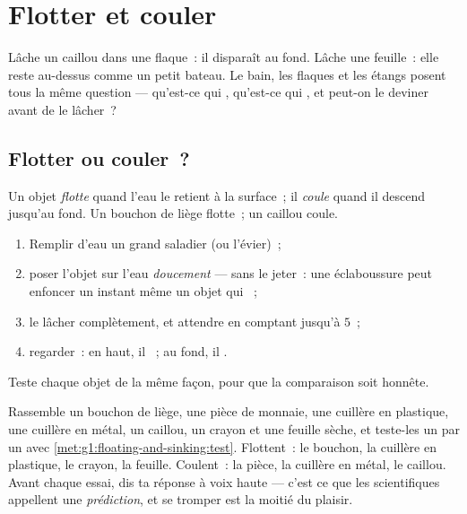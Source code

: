 \chapter{Flotter et couler}\label{ch:g1:floating-and-sinking}

Lâche un caillou dans une flaque~: il disparaît au fond. Lâche une
feuille~: elle reste au-dessus comme un petit bateau. Le bain, les
flaques et les étangs posent tous la même question --- qu'est-ce qui
, qu'est-ce qui , et peut-on le deviner avant de le
lâcher~?

\section{Flotter ou couler~?}

\begin{definition}\label{def:g1:floating-and-sinking:words}
Un objet \emph{flotte} quand l'eau le retient à la
surface~; il \emph{coule} quand il descend jusqu'au
fond. Un bouchon de liège flotte~; un caillou coule.
\end{definition}

\begin{method}\label{met:g1:floating-and-sinking:test}
\begin{enumerate}
  \item Remplir d'eau un grand saladier (ou l'évier)~;
  \item poser l'objet sur l'eau \emph{doucement} --- sans le jeter~:
        une éclaboussure peut enfoncer un instant même un objet qui
        ~;
  \item le lâcher complètement, et attendre en comptant jusqu'à $5$~;
  \item regarder~: en haut, il ~; au fond, il .
\end{enumerate}
Teste chaque objet de la même façon, pour que la comparaison soit
honnête.
\end{method}

\begin{example}\label{ex:g1:floating-and-sinking:sorting}
Rassemble un bouchon de liège, une pièce de monnaie, une cuillère en
plastique, une cuillère en métal, un caillou, un crayon et une
feuille sèche, et teste-les un par un avec
\cref{met:g1:floating-and-sinking:test}. Flottent~: le bouchon, la
cuillère en plastique, le crayon, la feuille. Coulent~: la pièce, la
cuillère en métal, le caillou. Avant chaque essai, dis ta réponse à
voix haute --- c'est ce que les scientifiques appellent une
\emph{prédiction}, et se tromper est la moitié du plaisir.
\end{example}


